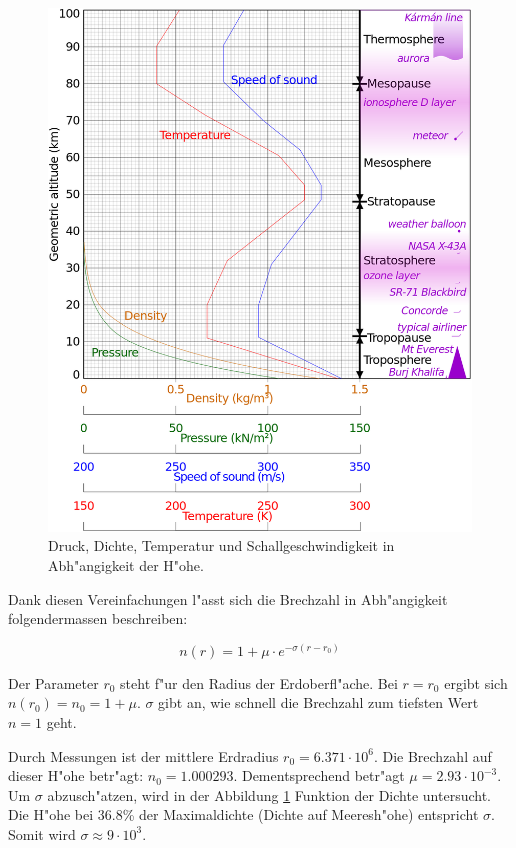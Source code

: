 \begin{refsection}
\begin{figure}
  \centering
  \includegraphics[scale=0.24]{licht/images/athmosphereProfile.png}
  
  \caption{Druck, Dichte, Temperatur und Schallgeschwindigkeit in Abh"angigkeit der H"ohe. \label{fig:athmosphere_profile}}
\end{figure}

Dank diesen Vereinfachungen l"asst sich die Brechzahl in Abh"angigkeit folgendermassen beschreiben:

$$n(r) = 1 + \mu \cdot e^{-\sigma (r - r_0)}$$

Der Parameter $r_0$ steht f"ur den Radius der Erdoberfl"ache. 
Bei $r = r_0$ ergibt sich $n(r_0) = n_0 = 1 + \mu$. 
$\sigma$ gibt an, wie schnell die Brechzahl zum tiefsten Wert $n = 1$ geht. 




Durch Messungen ist der mittlere Erdradius $r_0 = 6.371 \cdot 10^6$. 
Die Brechzahl auf dieser H"ohe betr"agt: $n_0 = 1.000293$.
Dementsprechend betr"agt $\mu = 2.93 \cdot 10^{-3}$. 
Um $\sigma$ abzusch"atzen, wird in der Abbildung \ref{fig:athmosphere_profile} Funktion der Dichte untersucht. 
Die H"ohe bei 36.8\% der Maximaldichte (Dichte auf Meeresh"ohe) entspricht $\sigma$. 
Somit wird $\sigma \approx 9 \cdot 10^3$.


\end{refsection}
